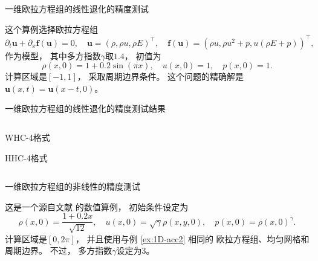 \documentclass[aspectratio=169]{beamer}
\begin{document}
\begin{frame}{一维欧拉方程组的线性退化的精度测试}
  
  \begin{example}[一维欧拉方程组的线性退化的精度测试]
    \label{ex:1D-acc2}
    这个算例选择欧拉方程组
    \begin{equation*}
      \label{eq:1D-Euler}
      {\partial_{t}}{\bm{u}} + {\partial_{x}}{\bm{f}}({\bm{u}}) = 0, \quad
      {\bm{u}} =(\rho, \rho u, \rho E)^\top, \quad
      {\bm{f}}({\bm{u}}) =(\rho u,\rho u^2+p, u(\rho E+p))^\top,
    \end{equation*}
    作为模型，
    其中多方指数$\gamma$取$1.4$，
    初值为
    \begin{equation*}
      \rho(x, 0) = 1 + 0.2\sin(\pi x), \quad u(x,0)=1, \quad p(x,0)=1.
    \end{equation*}
    计算区域是$[-1,1]$，
    采取周期边界条件。
    这个问题的精确解是${\bm{u}}(x,t) = {\bm{u}}(x-t,0)$。
  \end{example}
  
\end{frame}

\begin{frame}{一维欧拉方程组的线性退化的精度测试结果}
  
  \vspace{-3mm}
  \begin{columns}
    \begin{column}{0.2\textwidth}
      
      \centering
      
      WHC-4格式
      
      \vspace{0.4\textheight}
      
      HHC-4格式
      
    \end{column}
    \begin{column}{0.8\textwidth}
      \begin{small}
        
      \end{small}
    \end{column}
  \end{columns}
  
\end{frame}

\begin{frame}{一维欧拉方程组的非线性的精度测试}
  
  \begin{example}[一维欧拉方程组的非线性的精度测试]
    \label{ex:1D-acc3}
    这是一个源自文献 \citep{Gamma3-HWENO} 的数值算例，
    初始条件设定为
    \begin{equation*}
      \rho(x, 0)=\frac{1+0.2x}{\sqrt{12}}, \quad
      u(x, 0)=\sqrt{\gamma}\rho(x, y, 0), \quad
      p(x, 0)=\rho(x, 0)^\gamma.
    \end{equation*}
    计算区域是$[0, 2\pi]$，
    并且使用与例 \ref{ex:1D-acc2} 相同的
    欧拉方程组、均匀网格和周期边界。
    不过，
    多方指数$\gamma$设定为3。
  \end{example}
  
\end{frame}
\end{document}
